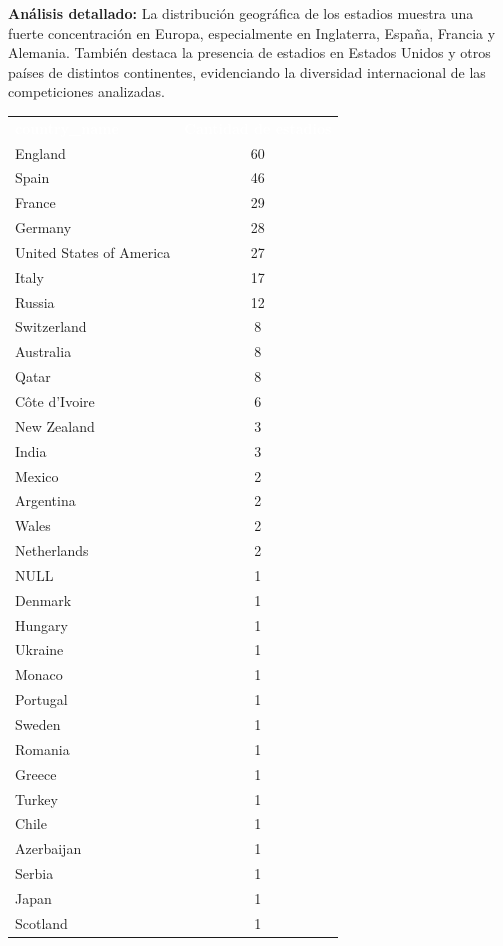 \documentclass[12pt,a4paper]{article}
\newcommand{\thead}[1]{%
  \cellcolor{tableheader}\textcolor{white}{\textbf{#1}}%
}
\begin{document}
\vspace{0.3cm}

\textbf{Análisis detallado:} 
La distribución geográfica de los estadios muestra una fuerte concentración en Europa, especialmente en Inglaterra, España, Francia y Alemania. También destaca la presencia de estadios en Estados Unidos y otros países de distintos continentes, evidenciando la diversidad internacional de las competiciones analizadas.

\begin{center}
\small
\begin{tabular}{lc}
\rowcolor{tableheader}
\thead{country\_name} & \thead{Cantidad de estadios} \\

\rowcolor{tablealt} England & 60 \\
\rowcolor{tablerow} Spain & 46 \\
\rowcolor{tablealt} France & 29 \\
\rowcolor{tablerow} Germany & 28 \\
\rowcolor{tablealt} United States of America & 27 \\
\rowcolor{tablerow} Italy & 17 \\
\rowcolor{tablealt} Russia & 12 \\
\rowcolor{tablerow} Switzerland & 8 \\
\rowcolor{tablealt} Australia & 8 \\
\rowcolor{tablerow} Qatar & 8 \\
\rowcolor{tablealt} Côte d'Ivoire & 6 \\
\rowcolor{tablerow} New Zealand & 3 \\
\rowcolor{tablealt} India & 3 \\
\rowcolor{tablerow} Mexico & 2 \\
\rowcolor{tablealt} Argentina & 2 \\
\rowcolor{tablerow} Wales & 2 \\
\rowcolor{tablealt} Netherlands & 2 \\
\rowcolor{tablerow} NULL & 1 \\
\rowcolor{tablealt} Denmark & 1 \\
\rowcolor{tablerow} Hungary & 1 \\
\rowcolor{tablealt} Ukraine & 1 \\
\rowcolor{tablerow} Monaco & 1 \\
\rowcolor{tablealt} Portugal & 1 \\
\rowcolor{tablerow} Sweden & 1 \\
\rowcolor{tablealt} Romania & 1 \\
\rowcolor{tablerow} Greece & 1 \\
\rowcolor{tablealt} Turkey & 1 \\
\rowcolor{tablerow} Chile & 1 \\
\rowcolor{tablealt} Azerbaijan & 1 \\
\rowcolor{tablerow} Serbia & 1 \\
\rowcolor{tablealt} Japan & 1 \\
\rowcolor{tablerow} Scotland & 1 \\

\end{tabular}
\end{center}
\end{document}
